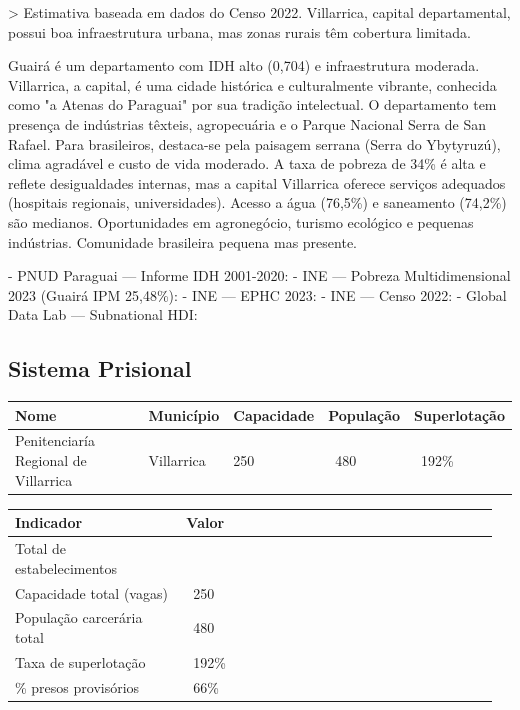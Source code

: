 > Estimativa baseada em dados do Censo 2022. Villarrica, capital departamental, possui boa infraestrutura urbana, mas zonas rurais têm cobertura limitada.


Guairá é um departamento com IDH alto (0,704) e infraestrutura moderada. Villarrica, a capital, é uma cidade histórica e culturalmente vibrante, conhecida como "a Atenas do Paraguai" por sua tradição intelectual. O departamento tem presença de indústrias têxteis, agropecuária e o Parque Nacional Serra de San Rafael. Para brasileiros, destaca-se pela paisagem serrana (Serra do Ybytyruzú), clima agradável e custo de vida moderado. A taxa de pobreza de 34\% é alta e reflete desigualdades internas, mas a capital Villarrica oferece serviços adequados (hospitais regionais, universidades). Acesso a água (76,5\%) e saneamento (74,2\%) são medianos. Oportunidades em agronegócio, turismo ecológico e pequenas indústrias. Comunidade brasileira pequena mas presente.


- PNUD Paraguai --- Informe IDH 2001-2020: 
- INE --- Pobreza Multidimensional 2023 (Guairá IPM 25,48\%): 
- INE --- EPHC 2023: 
- INE --- Censo 2022: 
- Global Data Lab --- Subnational HDI: 


\subsection{Sistema Prisional}



{\small
\setlength{\tabcolsep}{3pt}
\renewcommand{\arraystretch}{1.12}
{\small
\begin{tabularx}{\linewidth}{lXXXX}
\toprule
Nome & Município & Capacidade & População & Superlotação \\
\midrule
Penitenciaría Regional de Villarrica & Villarrica & 250 & ~480 & ~192\% \\
\bottomrule
\end{tabularx}
}
}


{\small
\setlength{\tabcolsep}{3pt}
\renewcommand{\arraystretch}{1.12}
\begin{tabularx}{\linewidth}{>{\raggedright\arraybackslash}p{0.34\linewidth} >{\raggedright\arraybackslash}p{0.62\linewidth}}
\toprule
Indicador & Valor \\
\midrule
Total de estabelecimentos & 1 \\
Capacidade total (vagas) & ~250 \\
População carcerária total & ~480 \\
Taxa de superlotação & ~192\% \\
\% presos provisórios & ~66\% \\
\bottomrule
\end{tabularx}
}


